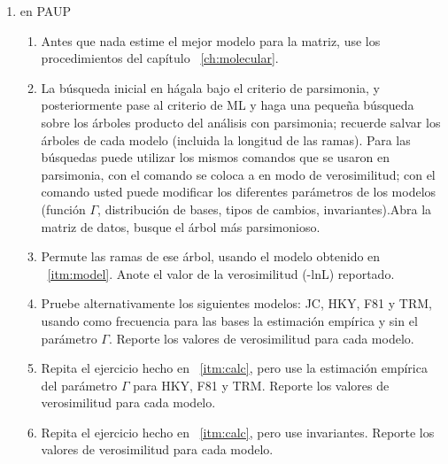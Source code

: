 \begin{enumerate}
\item{en PAUP}
	\begin{enumerate}
		\item \label{itm:model} Antes que nada estime el mejor modelo para la matriz, use los procedimientos del cap\'itulo ~\ref{ch:molecular}. 

		
		\item La b\'usqueda inicial en  h\'agala bajo el criterio de parsimonia, y posteriormente pase al criterio de ML y haga una \textrm{peque\~na} b\'usqueda sobre los \'arboles producto del an\'alisis con parsimonia; recuerde salvar los \'arboles de cada modelo (incluida la longitud de las ramas). Para las b\'usquedas puede utilizar los mismos comandos que se usaron en parsimonia, con el comando  se coloca a  en modo de verosimilitud; con el comando  usted puede modificar los diferentes par\'ametros de los modelos (funci\'on $\Gamma$, distribuci\'on de bases, tipos de cambios, invariantes).Abra la matriz de datos, busque el \'arbol m\'as parsimonioso.
		\item Permute las ramas de ese \'arbol, usando el modelo obtenido en ~\ref{itm:model}. Anote el valor de la verosimilitud (-lnL) reportado.
		\item \label{itm:calc} Pruebe alternativamente los siguientes modelos: JC, HKY, F81 y TRM, usando como frecuencia para las bases la estimaci\'on emp\'irica y sin el par\'ametro $\Gamma$. Reporte los valores de verosimilitud para cada modelo.



		\item Repita el ejercicio hecho en ~\ref{itm:calc}, pero use la estimaci\'on emp\'irica del par\'ametro $\Gamma$ para HKY, F81 y TRM. Reporte los valores de verosimilitud para cada modelo.
		
		\item Repita el ejercicio hecho en ~\ref{itm:calc}, pero use invariantes. Reporte los valores de verosimilitud para cada modelo.
		
	\end{enumerate}


\end{enumerate}
